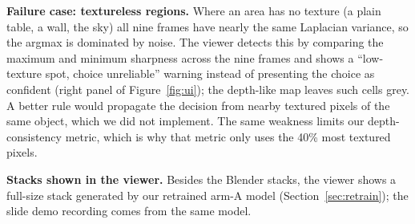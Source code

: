 \documentclass[11pt]{article}
\begin{document}
\textbf{Failure case: textureless regions.} Where an area has no texture (a plain table, a wall, the sky) all nine frames have nearly the same Laplacian variance, so the argmax is dominated by noise. The viewer detects this by comparing the maximum and minimum sharpness across the nine frames and shows a ``low-texture spot, choice unreliable'' warning instead of presenting the choice as confident (right panel of Figure~\ref{fig:ui}); the depth-like map leaves such cells grey. A better rule would propagate the decision from nearby textured pixels of the same object, which we did not implement. The same weakness limits our depth-consistency metric, which is why that metric only uses the 40\% most textured pixels.

\textbf{Stacks shown in the viewer.} Besides the Blender stacks, the viewer shows a full-size stack generated by our retrained arm-A model (Section~\ref{sec:retrain}); the slide demo recording comes from the same model.
\end{document}
